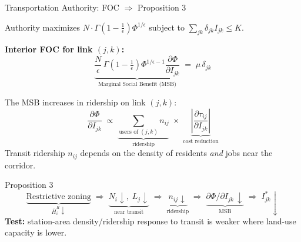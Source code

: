 \documentclass[10pt]{beamer}
\begin{document}
\begin{frame}[shrink=5]{Transportation Authority: FOC $\Rightarrow$ Proposition 3}

Authority maximizes $N\cdot\Gamma\!\left(1-\tfrac{1}{\epsilon}\right)\Phi^{1/\epsilon}$
subject to $\sum_{jk}\delta_{jk}I_{jk}\leq K$.

\medskip
\textbf{Interior FOC for link $(j,k)$:}
\[
  \underbrace{\frac{N}{\epsilon}\,\Gamma\!\!\left(1-\tfrac{1}{\epsilon}\right)\Phi^{1/\epsilon-1}
  \frac{\partial\Phi}{\partial I_{jk}}}_{\text{Marginal Social Benefit (MSB)}}
  \;=\; \mu\,\delta_{jk}
\]

\smallskip
The MSB increases in ridership on link $(j,k)$:
\[
  \frac{\partial\Phi}{\partial I_{jk}}
  \;\propto\;
  \underbrace{\sum_{\text{users of }(j,k)} n_{ij}}_{\text{ridership}}
  \;\times\;
  \underbrace{\left|\frac{\partial\tau_{ij}}{\partial I_{jk}}\right|}_{\text{cost reduction}}
\]
Transit ridership $n_{ij}$ depends on the density of residents \emph{and} jobs near the corridor.

\begin{alertblock}{Proposition 3}
\[
  \underbrace{\text{Restrictive zoning}}_{\bar H_i^R\downarrow}
  \;\Longrightarrow\;
  \underbrace{N_i\downarrow,\; L_j\downarrow}_{\text{near transit}}
  \;\Longrightarrow\;
  \underbrace{n_{ij}\downarrow}_{\text{ridership}}
  \;\Longrightarrow\;
  \underbrace{\partial\Phi/\partial I_{jk}\,\downarrow}_{\text{MSB}}
  \;\Longrightarrow\;
  I^*_{jk}\downarrow
\]
\textbf{Test:} station-area density/ridership response to transit is weaker
where land-use capacity is lower.
\end{alertblock}

\end{frame}
\end{document}
